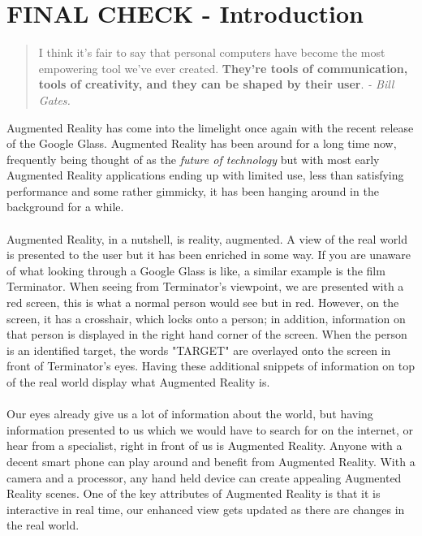 \documentclass[11pt]{article}
\begin{document}
\newpage
\tableofcontents
\newpage

\section{FINAL CHECK - Introduction}
\begin{quote}
I think it's fair to say that personal computers have become
		the most empowering tool we've ever created. \textbf{They're tools of
		communication, tools of creativity, and they can be shaped by
		their user}. \textit{- Bill Gates.}		
\end{quote}

Augmented Reality has come into the limelight once
again with the recent release of the Google Glass. Augmented Reality has 
been around for a long time now, frequently being
thought of as the \textit{future of technology} but with most
early Augmented Reality applications ending up with limited use, 
less than satisfying performance and some rather
gimmicky, it has been hanging around in the background for a while.
\\ \\
Augmented Reality, in a nutshell, is reality, augmented. A view of the 
real world is presented
to the user but it has been enriched in some way. If you are unaware
of what looking through a Google Glass is like, a similar example 
is the film Terminator. When seeing from Terminator's viewpoint, we are 
presented with a red screen, this is what a normal person would see but in red.
However, on the screen, it has a crosshair, which locks onto a person; in 
addition, information on that person is displayed in the right hand corner
of the screen.
When the person is an identified target, the words "TARGET" are 
overlayed onto the screen in front of Terminator's eyes. 
Having these additional snippets of information on top of the real
world display what Augmented Reality is.\\
\\
Our eyes already give us a lot of information about 
the world, but having information presented to us which we would have to 
search for on the internet, or hear from a specialist, right in front of
us is Augmented Reality. Anyone with a decent smart
phone can play around and benefit from Augmented Reality. 
With a camera and a processor, any hand held device can create
appealing Augmented Reality scenes. One of the key attributes of 
Augmented Reality is that it is interactive in real time, our enhanced 
view gets updated as there are changes in the real world. \\ 
\end{document}
